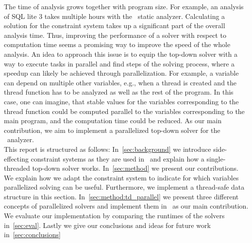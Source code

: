 The time of analysis grows together with program size. For example, an analysis of SQL lite 3 takes multiple hours with the \gob\ static analyzer. Calculating a solution for the constraint system takes up a significant part of the overall analysis time. Thus, improving the performance of a solver with respect to computation time seems a promising way to improve the speed of the whole analysis. An idea to approach this issue is to equip the top-down solver with a way to execute tasks in parallel and find steps of the solving process, where a speedup can likely be achieved through parallelization. For example, a variable can depend on multiple other variables, e.g., when a thread is created and the thread function has to be analyzed as well as the rest of the program. In this case, one can imagine, that stable values for the variables corresponding to the thread function could be computed parallel to the variables corresponding to the main program, and the computation time could be reduced.
As our main contribution, we aim to implement a parallelized top-down solver for the \gob\ analyzer.\\
This report is structured as follows: In~\autoref{sec:background} we introduce side-effecting constraint systems as they are used in \gob\ and explain how a single-threaded top-down solver works. In~\autoref{sec:method} we present our contributions. We explain how we adapt the constraint system to indicate for which variables parallelized solving can be useful. Furthermore, we implement a thread-safe data structure in this section. In~\autoref{sec:method:td_parallel} we present three different concepts of parallelized solvers and implement them in \gob\ as our main contribution. We evaluate our implementation by comparing the runtimes of the solvers in~\autoref{sec:eval}. Lastly we give our conclusions and ideas for future work in~\autoref{sec:conclusions} 
